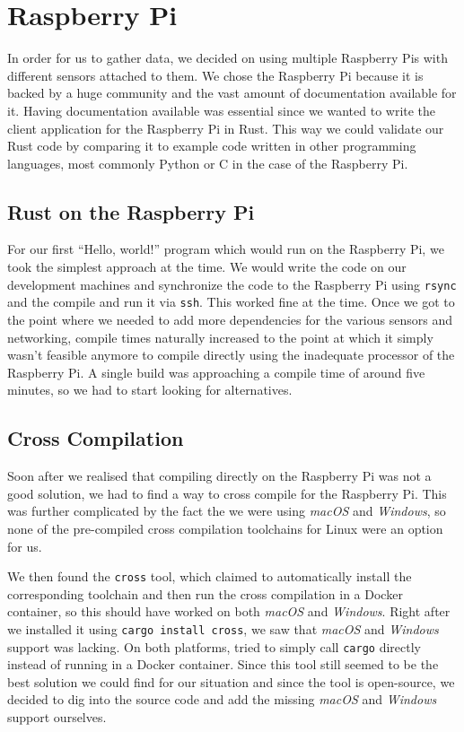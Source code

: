 \section{Raspberry Pi}

In order for us to gather data, we decided on using multiple Raspberry Pis with different sensors attached to them. We chose the Raspberry Pi because it is backed by a huge community and the vast amount of documentation available for it. Having documentation available was essential since we wanted to write the client application for the Raspberry Pi in Rust. This way we could validate our Rust code by comparing it to example code written in other programming languages, most commonly Python or C in the case of the Raspberry Pi.

\subsection{Rust on the Raspberry Pi}

For our first “Hello, world!” program which would run on the Raspberry Pi, we took the simplest approach at the time. We would write the code on our development machines and synchronize the code to the Raspberry Pi using \texttt{rsync} and the compile and run it via \texttt{ssh}. This worked fine at the time. Once we got to the point where we needed to add more dependencies for the various sensors and networking, compile times naturally increased to the point at which it simply wasn't feasible anymore to compile directly using the inadequate processor of the Raspberry Pi. A single build was approaching a compile time of around five minutes, so we had to start looking for alternatives.

\subsection{Cross Compilation}

Soon after we realised that compiling directly on the Raspberry Pi was not a good solution, we had to find a way to cross compile for the Raspberry Pi. This was further complicated by the fact the we were using \textit{macOS} and \textit{Windows}, so none of the pre-compiled cross compilation toolchains for Linux were an option for us.

We then found the \texttt{cross} tool, which claimed to automatically install the corresponding toolchain and then run the cross compilation in a Docker container, so this should have worked on both \textit{macOS} and \textit{Windows}. Right after we installed it using \texttt{cargo install cross}, we saw that \textit{macOS} and \textit{Windows} support was lacking. On both platforms, tried to simply call \texttt{cargo} directly instead of running in a Docker container. Since this tool still seemed to be the best solution we could find for our situation and since the tool is open-source, we decided to dig into the source code and add the missing \textit{macOS} and \textit{Windows} support ourselves.

